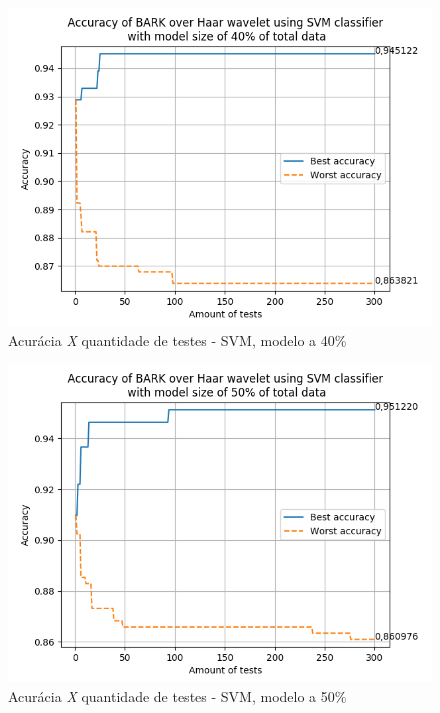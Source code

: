 \begin{myenv}{1.5}
		\newpage
		\begin{figure}[h]
			\centering
			\includegraphics{images/results/confusionMatrices/classifier_SVM_40.png}
			\caption{Acurácia \textit{X} quantidade de testes - SVM, modelo a 40\%}
			\label{fig:classifiersvm40}
		\end{figure}
		
	
		\newpage
		\begin{figure}[h]
			\centering
			\includegraphics{images/results/confusionMatrices/classifier_SVM_50.png}
			\caption{Acurácia \textit{X} quantidade de testes - SVM, modelo a 50\%}
			\label{fig:classifiersvm50}
		\end{figure}
		
		
	\end{myenv}

